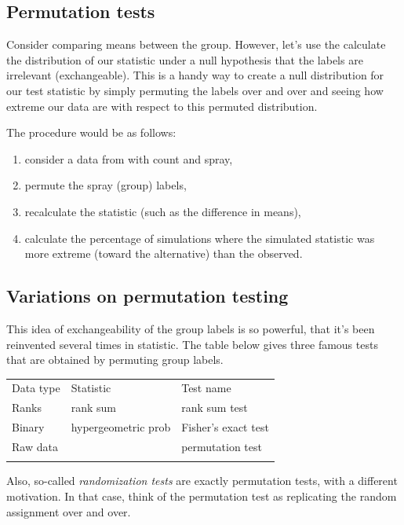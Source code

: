 \documentclass[]{article}
\begin{document}
\subsection{Permutation tests}\label{permutation-tests}

Consider comparing means between the group. However, let's use the
calculate the distribution of our statistic under a null hypothesis that
the labels are irrelevant (exchangeable). This is a handy way to create
a null distribution for our test statistic by simply permuting the
labels over and over and seeing how extreme our data are with respect to
this permuted distribution.

The procedure would be as follows:

\begin{enumerate}
\def\labelenumi{\arabic{enumi}.}
\itemsep1pt\parskip0pt
\item
  consider a data from with count and spray,
\item
  permute the spray (group) labels,
\item
  recalculate the statistic (such as the difference in means),
\item
  calculate the percentage of simulations where the simulated statistic
  was more extreme (toward the alternative) than the observed.
\end{enumerate}

\subsection{Variations on permutation
testing}\label{variations-on-permutation-testing}

This idea of exchangeability of the group labels is so powerful, that
it's been reinvented several times in statistic. The table below gives
three famous tests that are obtained by permuting group labels.

\begin{longtable}[c]{@{}lll@{}}
\toprule\addlinespace
Data type & Statistic & Test name
\\\addlinespace
\midrule\endhead
Ranks & rank sum & rank sum test
\\\addlinespace
Binary & hypergeometric prob & Fisher's exact test
\\\addlinespace
Raw data & & permutation test
\\\addlinespace
\bottomrule
\end{longtable}

Also, so-called \emph{randomization tests} are exactly permutation
tests, with a different motivation. In that case, think of the
permutation test as replicating the random assignment over and over.
\end{document}
